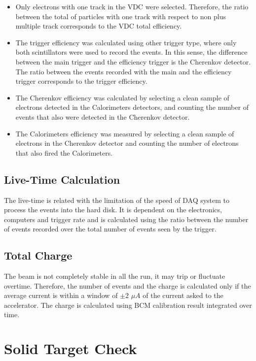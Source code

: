 \documentclass[preprint,12pt]{elsarticle}
\begin{document}
\begin{itemize}
\item Only electrons with one track in the VDC were selected. Therefore, the ratio between the total of particles with one track with respect to non plus multiple track corresponds to the VDC total efficiency. 
\item The trigger efficiency was calculated using other trigger type, where only both scintillators were used to record the events. In this sense, the difference between the main trigger and the efficiency trigger is the Cherenkov detector.  The ratio between the events recorded with the main and the efficiency trigger corresponds to the trigger efficiency.
\item The Cherenkov efficiency was calculated by selecting a clean sample of electrons detected in the Calorimeters detectors, and counting the number of events that also were detected in the Cherenkov detector.

\item The Calorimeters efficiency was measured by selecting a clean sample of electrons in the Cherenkov detector and counting the number of electrons that also fired the Calorimeters.

\end{itemize}


\subsection{Live-Time Calculation } 

The live-time is related with the limitation of the speed of DAQ system to process the events into the hard disk. It is dependent on the electronics, computers and trigger rate and is calculated using the ratio between the number of events recorded over the total number of events seen by the trigger. 



\subsection{ Total Charge}

The beam is not completely stable in all the run, it may trip or fluctuate overtime. Therefore, the number of events and the charge is calculated only if the average current is within a window of $\pm 2$ $\mu A$ of the current asked to the accelerator.  The charge is calculated using BCM calibration result integrated over time.


\section{Solid Target Check}
\end{document}
